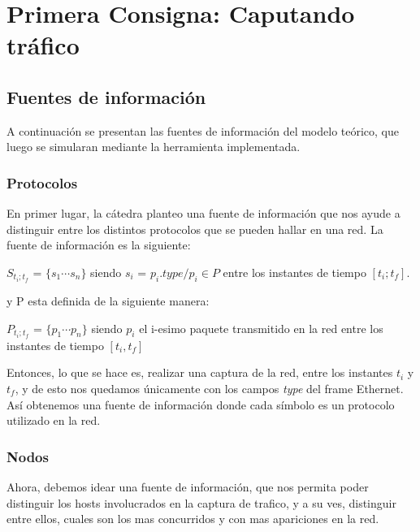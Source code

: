 \section{Primera Consigna: Caputando tr\'afico}\label{sec:metodos_1}

\subsection{Fuentes de información}

A continuación se presentan las fuentes de información del modelo teórico, que luego se simularan mediante la herramienta implementada. 

\subsubsection{Protocolos}

En primer lugar, la cátedra planteo una fuente de información que nos ayude a distinguir entre los distintos protocolos que se pueden hallar en una red. La fuente de información es la siguiente:

\begin{center}
	$S_{t_i;t_f}$ = $\{s_1 \dotsb s_n\}$ siendo $s_i$ = $p_i.type / p_i \in P$ entre los instantes de tiempo $[t_i; t_f ]$.
\end{center}

y P esta definida de la siguiente manera:

\begin{center}
	$P_{t_i;t_f}$ = $\{p_1 \dotsb p_n\}$ siendo $p_i$ el i-esimo paquete transmitido en la red entre los instantes de tiempo $[t_i, t_f]$
\end{center}

Entonces, lo que se hace es, realizar una captura de la red, entre los instantes $t_i$ y $t_f$, y de esto nos quedamos únicamente con los campos \textit{type} del frame Ethernet. Así obtenemos una fuente de información donde cada símbolo es un protocolo utilizado en la red.

\subsubsection{Nodos}

Ahora, debemos idear una fuente de información, que nos permita poder distinguir los hosts involucrados en la captura de trafico, y a su ves, distinguir entre ellos, cuales son los mas concurridos y con mas apariciones en la red.\\

